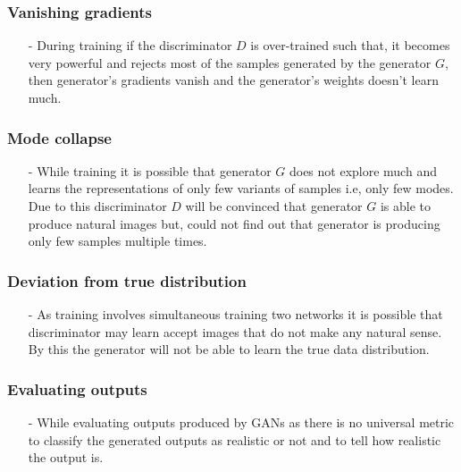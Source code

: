\documentclass [11pt]{article}
\begin{document}
\subsubsection{Vanishing gradients}
\begin{itemize}
    \item[-] During training if the discriminator $D$ is over-trained such that, it becomes very powerful and rejects most of the samples generated by the generator $G$, then generator's gradients vanish and the generator's weights doesn't learn much. 
\end{itemize}
    
\subsubsection{Mode collapse}
\begin{itemize}
    \item[-] While training it is possible that generator $G$ does not explore much and learns the representations of only few variants of samples i.e, only few modes. Due to this discriminator $D$ will be convinced that generator $G$ is able to produce natural images but, could not find out that generator is producing only few samples multiple times.
\end{itemize}

\subsubsection{Deviation from true distribution}
\begin{itemize}
    \item[-] As training involves simultaneous training two networks it is possible that discriminator may learn accept images that do not make any natural sense. By this the generator will not be able to learn the true data distribution.
\end{itemize}
    


\subsubsection{Evaluating outputs}
\begin{itemize}
    \item[-] While evaluating outputs produced by GANs as there is no universal metric to classify the generated outputs as realistic or not and to tell how realistic the output is.
\end{itemize}
\end{document}
